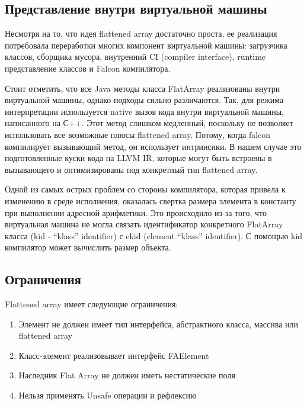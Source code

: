 \subsection{Представление внутри виртуальной машины}
Несмотря на то, что идея flattened array достаточно проста, ее реализация потребовала переработки многих компонент виртуальной машины: загрузчика классов, сборщика мусора, внутренний CI (compiler interface), runtime представление классов и Falcon компилятора.
\par 
Стоит отметить, что все Java методы класса FlatArray реализованы внутри виртуальной машины, однако подходы сильно различаются. Так, для режима интерпретации используется native вызов кода внутри виртуальной машины, написанного на С++. Этот метод слишком медленный, поскольку не позволяет использовать все возможные плюсы flattened array. Потому, когда falcon компилирует вызывающий метод, он использует интринсики. В нашем случае это подготовленные куски кода на LLVM IR, которые могут быть встроены в вызывающего и оптимизированы под конкретный тип flattened array. 
\par
Одной из самых острых проблем со стороны компилятора, которая привела к изменению в среде исполнения, оказалась свертка размера элемента в константу при выполнении адресной арифметики. Это происходило из-за того, что виртуальная машина не могла связать идентификатор конкретного FlatArray класса (kid - “klass” identifier) с ekid (element “klass” identifier). С помощью kid компилятор может вычислить размер объекта.

\subsection{Ограничения}
Flattened array имеет следующие ограничения:
\begin{enumerate}
	\item Элемент не должен имеет тип интерфейса, абстрактного класса, массива или flattened array
	\item Класс-элемент реализовывает интерфейс FAElement
	\item Наследник Flat Array не должен иметь нестатические поля
	\item Нельзя применять Unsafe операции и рефлексию
\end{enumerate}

\clearpage